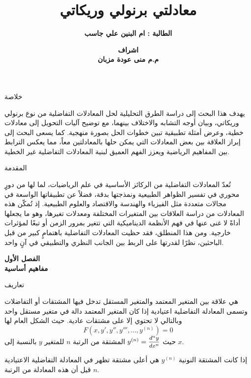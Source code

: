 



	\author{\textbf{الطالبة : ام البنين علي جاسب}}
	\title{\textbf{معادلتي برنولي وريكاتي}}
	\date{\textbf{اشراف\\
			 م.م منى عودة مزبان}}
	
		
		\begin{frame}
			\maketitle
		\end{frame}
		
		\begin{frame}{خلاصة}
			
			يهدف هذا البحث إلى دراسة الطرق التحليلية لحل المعادلات التفاضلية من نوع برنولي وريكاتي، وبيان أوجه التشابه والاختلاف بينهما، مع توضيح آليات التحويل إلى معادلات خطية، وعرض أمثلة تطبيقية تبين خطوات الحل بصورة منهجية. كما يسعى البحث إلى إبراز العلاقة بين بعض المعادلات التي يمكن حلها بالمعادلتين معاً، مما يعكس الترابط بين المفاهيم الرياضية ويعزز الفهم العميق لبنية المعادلات التفاضلية غير الخطية.
		\end{frame}
		\begin{frame}{المقدمة}
			
			تُعدّ المعادلات التفاضلية من الركائز الأساسية في علم الرياضيات، لما لها من دورٍ محوري في تفسير الظواهر الطبيعية ونمذجتها بدقة، فضلاً عن تطبيقاتها الواسعة في مجالات متعددة مثل الفيزياء والهندسة والاقتصاد والعلوم الطبيعية. إذ تُمكّن هذه المعادلات من دراسة العلاقات بين المتغيرات المختلفة ومعدلات تغيرها، وهو ما يجعلها أداةً لا غنى عنها في فهم الأنظمة الديناميكية التي تتغير بمرور الزمن أو تبعًا لمؤثرات خارجية. ومن هذا المنطلق، فقد حظيت المعادلات التفاضلية باهتمامٍ كبير من قبل الباحثين، نظرًا لقدرتها على الربط بين الجانب النظري والتطبيقي في آنٍ واحد.
		\end{frame}
		
		\begin{frame}
			\begin{center}\Huge
				\textbf{الفصل الأول}\\
				\textbf{مفاهيم أساسية}
			\end{center}
		\end{frame}
		
		\begin{frame}{تعاريف}
			\begin{definition}
				هي علاقة بين المتغير المعتمد والمتغير المستقل تدخل فيها المشتقات أو التفاضلات وتسمى المعادلة التفاضلية اعتيادية إذا كان المتغير المعتمد دالة في متغير مستقل واحد وبالتالي لا تحتوي إلا على مشتقات عادية. حيث الشكل العام لها
				\[
				F(x,y',y'',y''',\dots,y^{(n)})=0
				\]
				حيث $y^{(n)}=\mfrac{d^ny}{dx^n}$ المشتقة من الرتبة $n$ للمتغير $y$ بالنسبة إلى $x$.
			\end{definition}
			
			\begin{definition}
				إذا كانت المشتقة النونية $y^{(n)}$ هي أعلى مشتقة تظهر في المعادلة التفاضلية الاعتيادية قيل أن هذه المعادلة من الرتبة $n$.
			\end{definition}
		\end{frame}
		
